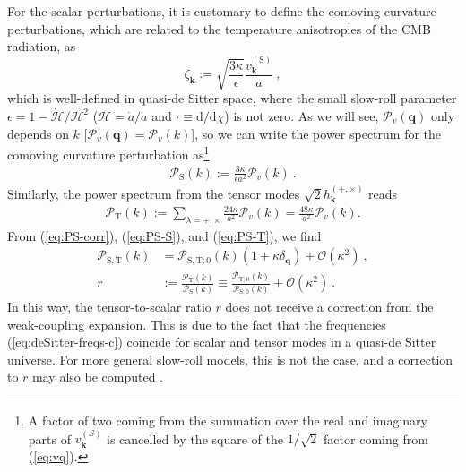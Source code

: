 \documentclass[12pt]{iopart}
\def\eq#1{\begin{equation}\begin{aligned}#1\end{aligned}\end{equation}}
\def\eref#1{(\ref{eq:#1})}
\def\D{\mathrm{d}}
\def\Ob{\mathcal{O}}
\def\k{\mathbf{k}}
\def\q{\mathbf{q}}
\begin{document}
For the scalar perturbations, it is customary to define the comoving curvature perturbations, which are related to the temperature anisotropies of the CMB radiation, as
\begin{equation}
\zeta_{\k}:=\sqrt{\frac{3\kappa}{\epsilon}}\frac{v_{\k}^{(\mathrm{S})}}{a} \ ,
\end{equation}
which is well-defined in quasi-de Sitter space, where the small slow-roll parameter $\epsilon = 1-\dot{\mathcal{H}}/\mathcal{H}^2$ ($\mathcal{H} = \dot{a}/a$ and $\cdot\equiv\D/\D\chi$) is not zero. As we will see, $\mathcal{P}_v(\q)$ only depends on $k$ [$\mathcal{P}_v(\q) = \mathcal{P}_v(k)$], so we can write the power spectrum for the comoving curvature perturbation as\footnote{A factor of two coming from the summation over the real and imaginary parts of $v_{\k}^{(S)}$ is cancelled by the square of the $1/\sqrt{2}$ factor coming from \eref{vq}.}
\eq{\label{eq:PS-S}
\mathcal{P}_{\mathrm{S}}(k) := \frac{3\kappa}{\epsilon a^2}\mathcal{P}_v(k) \ .
}
Similarly, the power spectrum from the tensor modes $\sqrt{2}h_{\k}^{(+,\times)}$ reads
\eq{
\label{eq:PS-T}
\mathcal{P}_{\mathrm{T}}(k) := \sum_{\lambda = +,\times}\frac{24\kappa}{a^2}\mathcal{P}_v(k) = \frac{48\kappa}{a^2}\mathcal{P}_v(k) .
}
From \eref{PS-corr}, \eref{PS-S}, and \eref{PS-T}, we find
\eq{
\label{eq:correction-power-spectra}
\mathcal{P}_{\mathrm{S},\mathrm{T}}(k) &= \mathcal{P}_{\mathrm{S},\mathrm{T};0}(k)(1+\kappa\delta_{\q}) +\Ob(\kappa^2) \ ,\\
r&:=\frac{\mathcal{P}_{\mathrm{T}}(k)}{\mathcal{P}_{\mathrm{S}}(k)} \equiv \frac{\mathcal{P}_{\mathrm{T};0}(k)}{\mathcal{P}_{\mathrm{S};0}(k)}+\Ob(\kappa^2) \ .
}
In this way, the tensor-to-scalar ratio $r$ does not receive a correction from the weak-coupling expansion. This is due to the fact that the frequencies \eref{deSitter-freqs-c} coincide for scalar and tensor modes in a quasi-de Sitter universe. For more general slow-roll models, this is not the case, and a correction to $r$ may also be computed \citep{Brizuela:2016gnz}.
\end{document}
